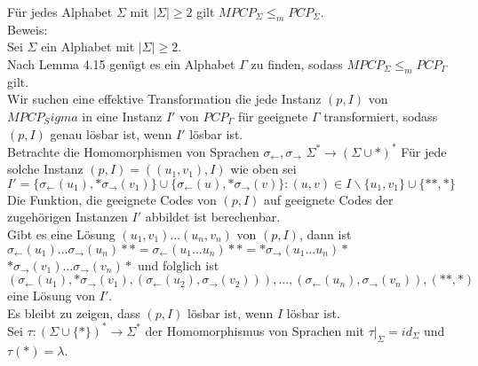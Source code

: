 \begin{lemma}{}
    Für jedes Alphabet $\Sigma$ mit $|\Sigma| \geq 2$ gilt $MPCP_\Sigma \leq_m PCP_\Sigma$. \\

    Beweis: \\
    Sei $\Sigma$ ein Alphabet mit $|\Sigma| \geq 2$. \\
    Nach Lemma 4.15 genügt es ein Alphabet $\Gamma$ zu finden, sodass $MPCP_\Sigma \leq_m PCP_\Gamma$ gilt. \\

    Wir suchen eine effektive Transformation die jede Instanz $(p, I)$ von $MPCP_Sigma$ in eine Instanz
    $I'$ von $PCP_\Gamma$ für geeignete $\Gamma$ transformiert, sodass $(p,I)$ genau lösbar ist, wenn $I'$ lösbar ist. \\

    Betrachte die Homomorphismen von Sprachen $\sigma_{\leftarrow}, \sigma_{\rightarrow}$ $\Sigma^* \rightarrow (\Sigma \cup{*})^*$
    Für jede solche Instanz $(p,I) = ((u_1,v_1), I)$ wie oben sei $I'=\{\sigma_{\leftarrow}(u_1),*\sigma_{\rightarrow}(v_1)\}
    \cup \{\sigma_{\leftarrow}(u),*\sigma_{\rightarrow}(v)\} : (u,v) \in I \backslash\{u_1,v_1\} \cup \{**,*\}$ \\
    
    Die Funktion, die geeignete Codes von $(p,I)$ auf geeignete Codes der zugehörigen Instanzen $I'$ abbildet ist berechenbar. \\

    Gibt es eine Lösung $(u_1,v_1)...(u_n,v_n)$ von $(p,I)$, dann ist \\
    $\sigma_\leftarrow(u_1)...\sigma_\rightarrow(u_n)** = \sigma_\leftarrow(u_1...u_n)** = *\sigma_\rightarrow(u_1...u_n)*$ \\
    $*\sigma_\rightarrow(v_1)...\sigma_\rightarrow(v_n)*$ und folglich ist \\
    $(\sigma_\leftarrow(u_1),*\sigma_\rightarrow(v_1),(\sigma_\leftarrow(u_2),\sigma_\rightarrow(v_2))),...,
    (\sigma_\leftarrow(u_n),\sigma_\rightarrow(v_n)),(**,*)$ eine Lösung von $I'$. \\

    Es bleibt zu zeigen, dass $(p,I)$ lösbar ist, wenn $I$ lösbar ist. \\

    Sei $\tau : (\Sigma \cup \{*\})^* \rightarrow \Sigma^*$ der Homomorphismus von Sprachen mit $\tau|_\Sigma = id_\Sigma$
    und $\tau(*) = \lambda$. \\


\end{lemma}
